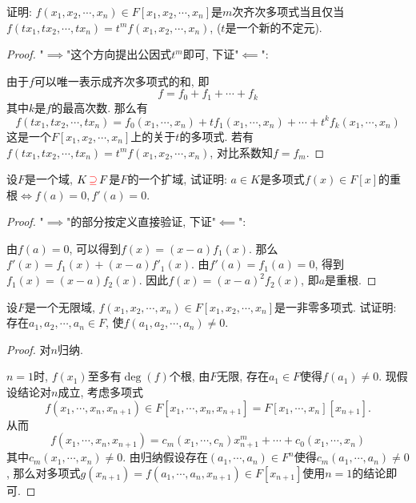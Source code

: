 \documentclass{../solutions-cn}
\begin{document}
\begin{exercise}[习题2.4.2]
    证明: $f(x_1, x_2, \cdots, x_n) \in F[x_1, x_2, \cdots, x_n]$是$m$次齐次多项式当且仅当$f(tx_1, tx_2, \cdots, tx_n) = t^mf(x_1, x_2, \cdots, x_n)$, ($t$是一个新的不定元).
\end{exercise}

\begin{proof}
    "$\implies$"这个方向提出公因式$t^m$即可, 下证"$\impliedby$":

    由于$f$可以唯一表示成齐次多项式的和, 即
    \[
        f = f_0 + f_1 + \cdots + f_k
    \]
    其中$k$是$f$的最高次数. 那么有
    \[
        f(tx_1, tx_2, \cdots, tx_n) = f_0(x_1, \cdots, x_n) + tf_1(x_1, \cdots, x_n) + \cdots + t^kf_k(x_1, \cdots, x_n)
    \]
    这是一个$F[x_1, x_2, \cdots, x_n]$上的关于$t$的多项式. 若有$f(tx_1, tx_2, \cdots, tx_n) = t^mf(x_1, x_2, \cdots, x_n)$, 对比系数知$f = f_m$.
\end{proof}

\begin{exercise}[习题2.4.3]
    设$F$是一个域, $K \,\textcolor{red}{\supseteq}\, F$是$F$的一个扩域, 试证明: $a \in K$是多项式$f(x) \in F[x]$的重根$\Leftrightarrow f(a) = 0, f'(a) = 0$.
\end{exercise}

\begin{proof}
    "$\implies$"的部分按定义直接验证, 下证"$\impliedby$":

    由$f(a) = 0$, 可以得到$f(x) = (x - a)f_1(x)$. 那么$f'(x) = f_1(x) + (x - a)f'_1(x)$. 由$f'(a) = f_1(a) = 0$, 得到$f_1(x) = (x - a)f_2(x)$. 因此$f(x) = (x - a)^2f_2(x)$, 即$a$是重根.
\end{proof}

\begin{exercise}[习题2.4.4]
    设$F$是一个无限域, $f(x_1, x_2, \cdots ,x_n) \in F[x_1, x_2, \cdots,x_n]$是一非零多项式. 试证明: 存在$a_1, a_2, \cdots, a_n \in F$, 使$f(a_1, a_2, \cdots, a_n) \neq 0$.
\end{exercise}

\begin{proof}
    对$n$归纳.
    
    $n = 1$时, $f(x_1)$至多有$\deg(f)$个根, 由$F$无限, 存在$a_1 \in F$使得$f(a_1) \neq 0$. 现假设结论对$n$成立, 考虑多项式
    \[
        f(x_1, \cdots, x_n, x_{n + 1}) \in F[x_1, \cdots, x_n, x_{n + 1}] = F[x_1, \cdots, x_n][x_{n + 1}].
    \]
    从而
    \[
        f(x_1, \cdots, x_n, x_{n + 1}) = c_m(x_1, \cdots, c_n)x_{n + 1}^m + \cdots + c_0(x_1, \cdots, x_n)
    \]
    其中$c_m(x_1, \cdots, x_n) \neq 0$. 由归纳假设存在$(a_1, \cdots, a_n) \in F^n$使得$c_m(a_1, \cdots, a_n) \neq 0$, 那么对多项式$g(x_{n + 1}) = f(a_1, \cdots, a_n, x_{n + 1}) \in F[x_{n + 1}]$使用$n = 1$的结论即可.
\end{proof}
\end{document}
